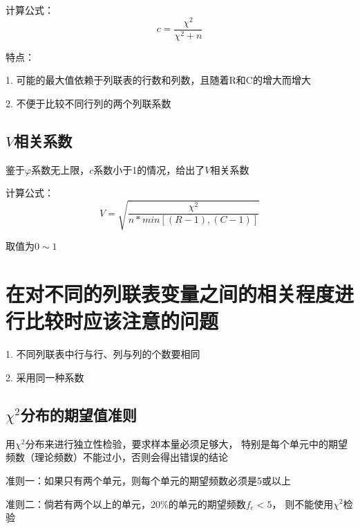 \documentclass[UTF8,10pt]{book}
\begin{document}
计算公式： $$c = \frac{\chi^2}{\chi^2 + n}$$ 

特点： 

1. 可能的最大值依赖于列联表的行数和列数，且随着R和C的增大而增大 

2. 不便于比较不同行列的两个列联系数	


\subsection{$V$相关系数}	
鉴于$\varphi$系数无上限，$c$系数小于1的情况，给出了$V$相关系数 

计算公式： 
$$V = \sqrt{\frac{\chi^2}{n*min[(R-1),(C-1)]}}$$ 

取值为$0 \sim 1$	

\section{在对不同的列联表变量之间的相关程度进行比较时应该注意的问题}	

1. 不同列联表中行与行、列与列的个数要相同 

2. 采用同一种系数	

\subsection{$\chi^2$分布的期望值准则}	

用$\chi^2$分布来进行独立性检验，要求样本量必须足够大，
特别是每个单元中的期望频数（理论频数）不能过小，否则会得出错误的结论 

准则一：如果只有两个单元，则每个单元的期望频数必须是5或以上 

准则二：倘若有两个以上的单元，20\%的单元的期望频数$f_e<5$，
则不能使用$\chi^2$检验	
\end{document}
